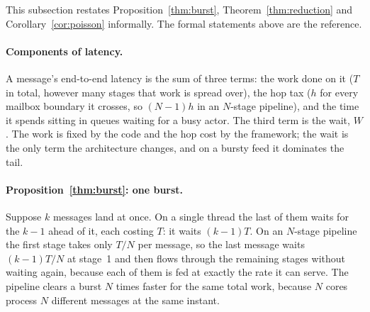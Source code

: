 \documentclass[11pt]{article}
\begin{document}
This subsection restates Proposition~\ref{thm:burst}, Theorem~\ref{thm:reduction} and
Corollary~\ref{cor:poisson} informally. The formal statements above are the reference.

\paragraph{Components of latency.} A message's end-to-end latency is the sum of three
terms: the work done on it ($T$ in total, however many stages that work is
spread over), the hop tax ($h$ for every mailbox boundary it crosses, so $(N-1)h$ in an
$N$-stage pipeline), and the time it spends sitting in queues waiting for a busy actor.
The third term is the wait, $W$. The work is fixed by the code and the hop cost by the
framework; the wait is the only term the architecture changes, and on a bursty feed it
dominates the tail.

\paragraph{Proposition~\ref{thm:burst}: one burst.} Suppose $k$ messages land at once. On
a single thread the last of them waits for the $k-1$ ahead of it, each costing $T$: it
waits $(k-1)T$. On an $N$-stage pipeline the first stage takes only $T/N$ per message, so
the last message waits $(k-1)T/N$ at stage~1 and then flows through the remaining stages
without waiting again, because each of them is fed at exactly the rate it can serve. The pipeline clears a burst $N$ times faster for the same total work, because $N$ cores
process $N$ different messages at the same instant.
\end{document}
